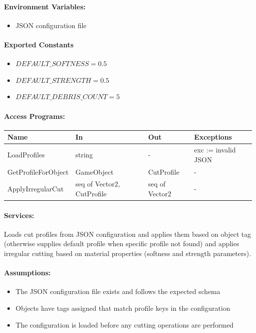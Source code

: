 \documentclass[12pt, titlepage]{article}
\begin{document}
\paragraph{Environment Variables:}
\begin{itemize}
\item JSON configuration file
\end{itemize}

\paragraph{Exported Constants}
\begin{itemize}
\item $DEFAULT\_SOFTNESS = 0.5$
\item $DEFAULT\_STRENGTH = 0.5$
\item $DEFAULT\_DEBRIS\_COUNT = 5$
\end{itemize}

\paragraph{Access Programs:}

\begin{center}
\begin{tabular}{p{37mm}p{32mm}p{25mm}p{4cm}}
\toprule
\textbf{Name} & \textbf{In} & \textbf{Out} & \textbf{Exceptions} \\
\midrule
LoadProfiles & string & - & exc := invalid JSON \\
GetProfileForObject & GameObject & CutProfile & - \\
ApplyIrregularCut & seq of Vector2, CutProfile & seq of Vector2 & - \\
\bottomrule
\end{tabular}
\end{center}

\paragraph{Services:}
Loads cut profiles from JSON configuration and applies them based on object tag (otherwise supplies default profile when specific profile not found) and applies irregular cutting based on material properties (softness and strength parameters).

\paragraph{Assumptions:}
\begin{itemize}
\item The JSON configuration file exists and follows the expected schema
\item Objects have tags assigned that match profile keys in the configuration
\item The configuration is loaded before any cutting operations are performed
\end{itemize}
\end{document}
